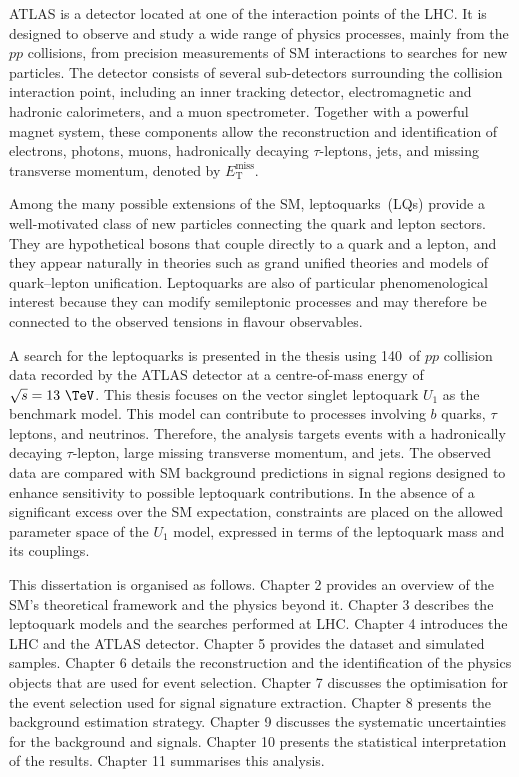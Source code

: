 ATLAS is a detector located at one of the interaction points of the LHC. 
It is designed to observe and study a wide range of physics processes, mainly from the $pp$ collisions, from precision measurements of SM interactions to searches for new particles. 
The detector consists of several sub-detectors surrounding the collision interaction point, including an inner tracking detector, electromagnetic and hadronic calorimeters, and a muon spectrometer. 
Together with a powerful magnet system, these components allow the reconstruction and identification of electrons, photons, muons, hadronically decaying $\tau$-leptons, jets, and missing transverse momentum, denoted by $E_{\mathrm{T}}^{\mathrm{miss}}$.

Among the many possible extensions of the SM, leptoquarks~(LQs) provide a well-motivated class of new particles connecting the quark and lepton sectors. 
They are hypothetical bosons that couple directly to a quark and a lepton, and they appear naturally in theories such as grand unified theories and models of quark--lepton unification. 
Leptoquarks are also of particular phenomenological interest because they can modify semileptonic processes and may therefore be connected to the observed tensions in flavour observables.

A search for the leptoquarks is presented in the thesis using 140~\ifb of $pp$ collision data recorded by the ATLAS detector at a centre-of-mass energy of $\sqrt{s}=13~\TeV$. 
This thesis focuses on the vector singlet leptoquark $U_{1}$ as the benchmark model. 
This model can contribute to processes involving $b$ quarks, $\tau$ leptons, and neutrinos.
Therefore, the analysis targets events with a hadronically decaying $\tau$-lepton, large missing transverse momentum, and jets. 
The observed data are compared with SM background predictions in signal regions designed to enhance sensitivity to possible leptoquark contributions. 
In the absence of a significant excess over the SM expectation, constraints are placed on the allowed parameter space of the $U_{1}$ model, expressed in terms of the leptoquark mass and its couplings.

This dissertation is organised as follows. 
Chapter 2 provides an overview of the SM's theoretical framework and the physics beyond it.
Chapter 3 describes the leptoquark models and the searches performed at LHC. 
Chapter 4 introduces the LHC and the ATLAS detector.
Chapter 5 provides the dataset and simulated samples.
Chapter 6 details the reconstruction and the identification of the physics objects that are used for event selection.
Chapter 7 discusses the optimisation for the event selection used for signal signature extraction.
Chapter 8 presents the background estimation strategy.
Chapter 9 discusses the systematic uncertainties for the background and signals.
Chapter 10 presents the statistical interpretation of the results.
Chapter 11 summarises this analysis.
